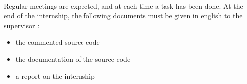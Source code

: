 ~~


Regular meetings are expected, and at each time a task has been done. At the end of the internship, the following documents must be given in english to the supervisor : 
\begin{itemize}
	\item the commented source code 
	\item the documentation of the source code  
	\item a report on the internship 
\end{itemize}

